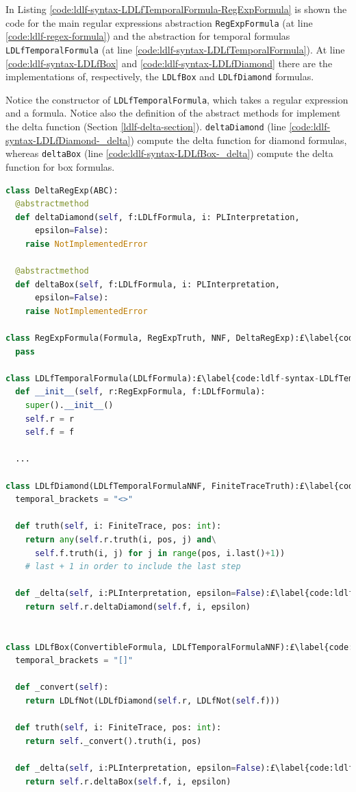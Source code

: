 In Listing \ref{code:ldlf-syntax-LDLfTemporalFormula-RegExpFormula} is shown the code for the main regular expressions abstraction \texttt{RegExpFormula} (at line \ref{code:ldlf-regex-formula}) and the abstraction for \LDLf temporal formulas \texttt{LDLfTemporalFormula} (at line \ref{code:ldlf-syntax-LDLfTemporalFormula}). At line \ref{code:ldlf-syntax-LDLfBox} and \ref{code:ldlf-syntax-LDLfDiamond} there are the implementations of, respectively, the \texttt{LDLfBox} and \texttt{LDLfDiamond} formulas.

Notice the constructor of \texttt{LDLfTemporalFormula}, which takes a regular expression and a \LDLf formula. Notice also the definition of the abstract methods for implement the delta function (Section \ref{ldlf-delta-section}). \texttt{deltaDiamond} (line \ref{code:ldlf-syntax-LDLfDiamond-_delta}) compute the delta function for diamond \LDLf formulas, whereas \texttt{deltaBox} (line \ref{code:ldlf-syntax-LDLfBox-_delta}) compute the delta function for box \LDLf formulas.
\begin{lstlisting}[language=Python, style=Python, escapechar = £, label={code:ldlf-syntax-LDLfTemporalFormula-RegExpFormula}, caption={Regular Expression abstract class \texttt{RegExpFormula} and \LDLf formulas \texttt{LDLfFormula}.}]
class DeltaRegExp(ABC):
  @abstractmethod
  def deltaDiamond(self, f:LDLfFormula, i: PLInterpretation, 
      epsilon=False):
    raise NotImplementedError

  @abstractmethod
  def deltaBox(self, f:LDLfFormula, i: PLInterpretation, 
      epsilon=False):
    raise NotImplementedError

class RegExpFormula(Formula, RegExpTruth, NNF, DeltaRegExp):£\label{code:ldlf-regex-formula}£
  pass

class LDLfTemporalFormula(LDLfFormula):£\label{code:ldlf-syntax-LDLfTemporalFormula}£
  def __init__(self, r:RegExpFormula, f:LDLfFormula):
    super().__init__()
    self.r = r
    self.f = f

  ...    
  
class LDLfDiamond(LDLfTemporalFormulaNNF, FiniteTraceTruth):£\label{code:ldlf-syntax-LDLfDiamond}£
  temporal_brackets = "<>"

  def truth(self, i: FiniteTrace, pos: int):
    return any(self.r.truth(i, pos, j) and\
      self.f.truth(i, j) for j in range(pos, i.last()+1))
    # last + 1 in order to include the last step

  def _delta(self, i:PLInterpretation, epsilon=False):£\label{code:ldlf-syntax-LDLfDiamond-_delta}£
    return self.r.deltaDiamond(self.f, i, epsilon)


class LDLfBox(ConvertibleFormula, LDLfTemporalFormulaNNF):£\label{code:ldlf-syntax-LDLfBox}£
  temporal_brackets = "[]"

  def _convert(self):
    return LDLfNot(LDLfDiamond(self.r, LDLfNot(self.f)))

  def truth(self, i: FiniteTrace, pos: int):
    return self._convert().truth(i, pos)

  def _delta(self, i:PLInterpretation, epsilon=False):£\label{code:ldlf-syntax-LDLfBox-_delta}£
    return self.r.deltaBox(self.f, i, epsilon)
\end{lstlisting}

